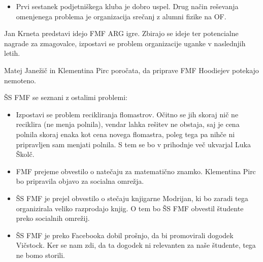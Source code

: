 \documentclass{seja}
\begin{document}
\begin{ad}
\begin{itemize}
        \item
        Prvi sestanek podjetniškega kluba je dobro uspel. Drug način reševanja omenjenega problema je organizacija srečanj z alumni fizike na OF.
    \end{itemize}
    \item
    Jan Krneta predstavi idejo FMF ARG igre. Zbirajo se ideje ter potencialne nagrade za zmagovalce, izpostavi se problem organizacije uganke v naslednjih letih.
    \item
    Matej Janežič in Klementina Pirc poročata, da priprave FMF Hoodiejev potekajo nemoteno.
    \item
    ŠS FMF se seznani z ostalimi problemi:
    \begin{itemize}
        \item Izpostavi se problem recikliranja flomastrov. Očitno se jih skoraj nič ne reciklira (ne menja polnila), vendar lahka rešitev ne obstaja, saj je cena polnila skoraj enaka kot cena novega flomastra, poleg tega pa nihče ni pripravljen sam menjati polnila. S tem se bo v prihodnje več ukvarjal Luka Školč. 
        \item
        FMF prejeme obvestilo o natečaju za matematično znamko. Klementina Pirc bo pripravila objavo za socialna omrežja.
        \item
        ŠS FMF je prejel obvestilo o stečaju knjigarne Modrijan, ki bo zaradi tega organizirala veliko razprodajo knjig. O tem bo ŠS FMF obvestil študente preko socialnih omrežij.
        \item
        ŠS FMF je preko Facebooka dobil prošnjo, da bi promovirali dogodek Vičstock. Ker se nam zdi, da ta dogodek ni relevanten za naše študente, tega ne bomo storili.
    \end{itemize}
\end{ad}
\end{document}
